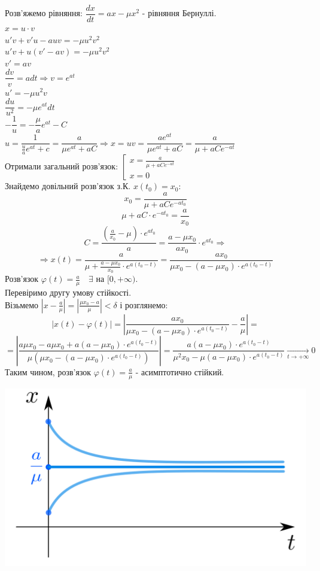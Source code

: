 Розв'яжемо рівняння: $ \dfrac{dx}{dt} = ax - \mu x^2 $ - рівняння Бернуллі.\\
$x = u\cdot v $\\
$u'v + v'u - auv = - \mu u^2 v^2 $\\
$u'v + u(v' - av) = - \mu u^2 v^2 $\\
$v' = av$\\
$ \dfrac{dv}{v} = adt \Longrightarrow v = e^{at}$\\
$u' =- \mu u^2 v$\\
$ \dfrac{du}{u^2} = - \mu e^{at}dt $\\
$- \dfrac{1}{u} = -\dfrac{ \mu}{a}e^{at} - C$\\
$ u = \dfrac{1}{ \frac{u}{a} e^{at} +c } = \dfrac{a}{ \mu e^{at} + aC} \Longrightarrow x = uv = \dfrac{a e^{at}}{ \mu e^{at} + aC  }  =  \dfrac{a}{ \mu  + aCe^{-at}}  $\\
$
\text{Отримали загальний розв'язок: } \left[ \begin{gathered}
 x= \frac{a}{ \mu  + aCe^{-at}}\\
 x = 0
\end{gathered} \right.
$\\
Знайдемо довільний розв'язок з.К. $x(t_0) = x_0:$
$$
x_0 = \frac{a}{\mu + aCe^{-at_0}}
$$
$$
\mu + aC\cdot e^{-at_0} = \frac{a}{x_0}
$$
$$
C = \frac{\left( \frac{a}{x_0} - \mu  \right)\cdot e^{at_0} }{a} = \frac{a - \mu x_0}{ax_0}\cdot e^{at_0} \Longrightarrow
$$
$$
\Longrightarrow x(t) = \frac{a}{ \mu + \frac{a - \mu x_0}{x_0} \cdot e^{a(t_0 - t)} } = \frac{ax_0}{ \mu x_0 - (a - \mu x_0 ) \cdot e^{a(t_0-t)}}
$$
Розв'язок $ \varphi (t) = \frac{a}{\mu} \quad \exists $  на $[0, + \infty)$.\\
Перевіримо другу умову стійкості. \\
Візьмемо $ \left| x - \frac{a}{\mu} \right| = \left| \frac{\mu x_0 - a}{\mu}  \right| < \delta $ і розглянемо:
$$
\left| x(t) - \varphi(t) \right| = \left| \frac{ax_0}{\mu x_0 - (a - \mu x_0) \cdot e^{a (t_0 - t)}}  - \frac{a}{ \mu}  \right| =
$$
$$
= \left| \frac{a\mu x_0 - a\mu x_0 + a (a - \mu x_0 )\cdot e^{a(t_0 - t)}}{\mu (\mu x_0 - (a- \mu x_0)\cdot e^{a(t_0 -t)})}  \right| = \frac{a (a - \mu x_0)\cdot e^{a (t_0 - t)}}{ \mu^2 x_0 - \mu (a- \mu x_0) \cdot e^{a(t_0 - t)}} \xrightarrow[t\to +\infty]{} 0
$$
Таким чином, розв'язок $\varphi(t) = \frac{a}{\mu}$ - асимптотично стійкий.
\begin{center} \includegraphics[scale=0.3]{assets/lectures_recent-0b98e3f0.png} \end{center}
